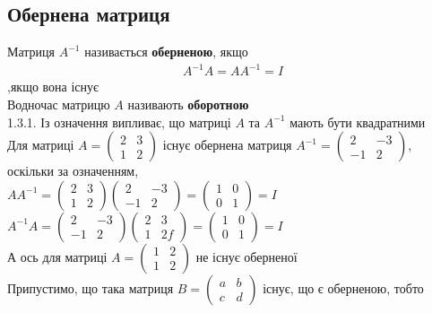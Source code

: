 \documentclass[a4paper, 10pt]{article}
\theoremstyle{theoremdd}
\begin{document}
	\subsection{Обернена матриця}
	 Матриця $A^{-1}$ називається \textbf{оберненою}, якщо
	\begin{align*}
	A^{-1} A = A A^{-1} = I
	\end{align*}
	,якщо вона існує\\
	Водночас матрицю $A$ називають \textbf{оборотною}
	\bigskip \\
	\rm{1.3.1.} Із означення випливає, що матриці $A$ та $A^{-1}$ мають бути квадратними 
	\bigskip \\
	 Для матриці $A = \begin{pmatrix}
	2 & 3 \\
	1 & 2
	\end{pmatrix}$ існує обернена матриця $A^{-1} = \begin{pmatrix}
	2 & -3 \\
	-1 & 2
	\end{pmatrix}$, оскільки за означенням,\\
	$AA^{-1} = \begin{pmatrix}
	2 & 3 \\
	1 & 2
	\end{pmatrix} \begin{pmatrix}
	2 & -3 \\
	-1 & 2
	\end{pmatrix} = \begin{pmatrix}
	1 & 0 \\
	0 & 1
	\end{pmatrix} = I$\\
	$A^{-1}A = \begin{pmatrix}
	2 & -3 \\
	-1 & 2
	\end{pmatrix} \begin{pmatrix}
	2 & 3 \\
	1 & 2f
	\end{pmatrix} = \begin{pmatrix}
	1 & 0 \\
	0 & 1
	\end{pmatrix} = I$
	\bigskip \\
	 А ось для матриці $A = \begin{pmatrix}
	1 & 2 \\
	1 & 2
	\end{pmatrix}$ не існує оберненої\\
	Припустимо, що така матриця $B = \begin{pmatrix}
	a & b \\
	c & d
	\end{pmatrix}$ існує, що є оберненою, тобто\\
\end{document}
